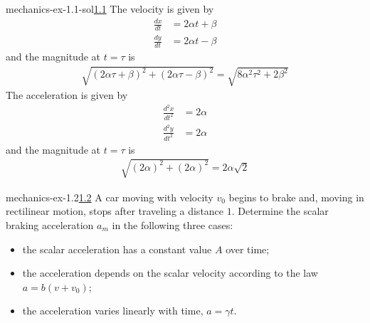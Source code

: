 \documentclass[preview]{standalone}
\begin{document}
\begin{snippetsolution}{mechanics-ex-1.1-sol}{\underline{1.1}}
    The velocity is given by
    \begin{align*}
        \frac{dx}{dt} &= 2\alpha t + \beta \\
        \frac{dy}{dt} &= 2\alpha t - \beta
    \end{align*}
    and the magnitude at \(t=\tau\) is
    \begin{align*}
        \sqrt{{(2\alpha\tau + \beta)}^2 + {(2\alpha\tau - \beta)}^2}
        = \sqrt{8\alpha^2\tau^2 + 2\beta^2}
    \end{align*}
    The acceleration is given by
    \begin{align*}
        \frac{d^2x}{dt^2} &= 2\alpha \\
        \frac{d^2y}{dt^2} &= 2\alpha
    \end{align*}
    and the magnitude at \(t=\tau\) is
    \begin{align*}
        \sqrt{{(2\alpha)}^2 + {(2\alpha)}^2} = 2\alpha\sqrt{2}
    \end{align*}
\end{snippetsolution}

\begin{snippetexercise}{mechanics-ex-1.2}{\underline{1.2}}
    A car moving with velocity \(v_0\) begins to brake and, moving in rectilinear motion, stops after traveling a distance \(1\).
    Determine the scalar braking acceleration \(a_m\) in the following three cases:
    \begin{itemize}
        \item the scalar acceleration has a constant value \(A\) over time;
        \item the acceleration depends on the scalar velocity according to the law \(a = b(v + v_0)\);
        \item the acceleration varies linearly with time, \(a = \gamma t\).
    \end{itemize}
\end{snippetexercise}
\end{document}
